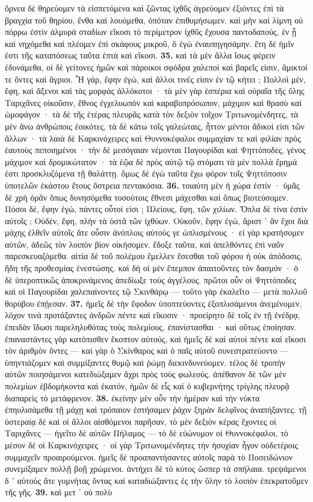 \documentclass[a4paper, 11pt, oneside, polutonikogreek, german]{article}
\begin{document}
ὄρνεα δὲ θηρεύομεν τὰ εἰσπετόμενα καὶ ζῶντας ἰχθῦς ἀγρεύομεν ἐξιόντες ἐπὶ τὰ βραγχία τοῦ θηρίου, ἔνθα καὶ λουόμεθα, ὁπόταν ἐπιθυμήσωμεν. καὶ μὴν καὶ λίμνη οὐ πόρρω ἐστὶν ἁλμυρὰ σταδίων εἴκοσι τὸ περίμετρον ἰχθῦς ἔχουσα παντοδαπούς, ἐν ᾗ καὶ νηχόμεθα καὶ πλέομεν ἐπὶ σκάφους μικροῦ, ὃ ἐγὼ ἐναυπηγησάμην. ἔτη δὲ ἡμῖν ἐστι τῆς καταπόσεως ταῦτα ἑπτὰ καὶ εἴκοσι. \textbf{35.} καὶ τὰ μὲν ἄλλα ἴσως φέρειν ἐδυνάμεθα, οἱ δὲ γείτονες ἡμῶν καὶ πάροικοι σφόδρα χαλεποὶ καὶ βαρεῖς εἰσιν, ἄμικτοί τε ὄντες καὶ ἄγριοι. Ἦ γάρ, ἔφην ἐγώ, καὶ ἄλλοι τινές εἰσιν ἐν τῷ κήτει ; Πολλοὶ μέν, ἔφη, καὶ ἄξενοι καὶ τὰς μορφὰς ἀλλόκοτοι · τὰ μὲν γὰρ ἑσπέρια καὶ οὐραῖα τῆς ὕλης Ταριχᾶνες οἰκοῦσιν, ἔθνος ἐγχελυωπὸν καὶ καραβοπρόσωπον, μάχιμον καὶ θρασὺ καὶ ὠμοφάγον · τὰ δὲ τῆς ἑτέρας πλευρᾶς κατὰ τὸν δεξιὸν τοῖχον Τριτωνομένδητες, τὰ μὲν ἄνω ἀνθρώποις ἐοικότες, τὰ δὲ κάτω τοῖς γαλεώταις, ἧττον μέντοι ἄδικοί εἰσι τῶν ἄλλων · τὰ λαιὰ δὲ Καρκινόχειρες καὶ Θυννοκέφαλοι συμμαχίαν τε καὶ φιλίαν πρὸς ἑαυτοὺς πεποιημένοι · τὴν δὲ μεσόγαιαν νέμονται Παγουρίδαι καὶ Ψηττόποδες, γένος μάχιμον καὶ δρομικώτατον · τὰ ἑῷα δὲ πρὸς αὐτῷ τῷ στόματι τὰ μὲν πολλὰ ἔρημά ἐστι προσκλυζόμενα τῇ θαλάττῃ. ὅμως δὲ ἐγὼ ταῦτα ἔχω φόρον τοῖς Ψηττόποσιν ὑποτελῶν ἑκάστου ἔτους ὄστρεια πεντακόσια. \textbf{36.} τοιαύτη μὲν ἡ χώρα ἐστίν · ὑμᾶς δὲ χρὴ ὁρᾶν ὅπως δυνησόμεθα τοσούτοις ἔθνεσι μάχεσθαι καὶ ὅπως βιοτεύσομεν. Πόσοι δέ, ἔφην ἐγώ, πάντες οὗτοί εἰσι ; Πλείους, ἔφη, τῶν χιλίων. Ὅπλα δὲ τίνα ἐστὶν αὐτοῖς ; Οὐδέν, ἔφη, πλὴν τὰ ὀστᾶ τῶν ἰχθύων. Οὐκοῦν, ἔφην ἐγώ, ἄριστ ᾽ ἂν ἔχοι διὰ μάχης ἐλθεῖν αὐτοῖς ἅτε οὖσιν ἀνόπλοις αὑτούς γε ὡπλισμένους · εἰ γὰρ κρατήσομεν αὐτῶν, ἀδεῶς τὸν λοιπὸν βίον οἰκήσομεν. ἔδοξε ταῦτα, καὶ ἀπελθόντες ἐπὶ ναῦν παρεσκευαζόμεθα. αἰτία δὲ τοῦ πολέμου ἔμελλεν ἔσεσθαι τοῦ φόρου ἡ οὐκ ἀπόδοσις, ἤδη τῆς προθεσμίας ἐνεστώσης. καὶ δὴ οἱ μὲν ἔπεμπον ἀπαιτοῦντες τὸν δασμόν · ὁ δὲ ὑπεροπτικῶς ἀποκρινάμενος ἀπεδίωξε τοὺς ἀγγέλους. πρῶτοι οὖν οἱ Ψηττόποδες καὶ οἱ Παγουρίδαι χαλεπαίνοντες τῷ Σκινθάρῳ --- τοῦτο γὰρ ἐκαλεῖτο --- μετὰ πολλοῦ θορύβου ἐπῄεσαν. \textbf{37.} ἡμεῖς δὲ τὴν ἔφοδον ὑποπτεύοντες ἐξοπλισάμενοι ἀνεμένομεν, λόχον τινὰ προτάξαντες ἀνδρῶν πέντε καὶ εἴκοσιν · προείρητο δὲ τοῖς ἐν τῇ ἐνέδρᾳ, ἐπειδὰν ἴδωσι παρεληλυθότας τοὺς πολεμίους, ἐπανίστασθαι · καὶ οὕτως ἐποίησαν. ἐπαναστάντες γὰρ κατόπισθεν ἔκοπτον αὐτούς, καὶ ἡμεῖς δὲ καὶ αὐτοὶ πέντε καὶ εἴκοσι τὸν ἀριθμὸν ὄντες --- καὶ γὰρ ὁ Σκίνθαρος καὶ ὁ παῖς αὐτοῦ συνεστρατεύοντο --- ὑπηντιάζομεν καὶ συμμίξαντες θυμῷ καὶ ῥώμῃ διεκινδυνεύομεν. τέλος δὲ τροπὴν αὐτῶν ποιησάμενοι κατεδιώξαμεν ἄχρι πρὸς τοὺς φωλεούς. ἀπέθανον δὲ τῶν μὲν πολεμίων ἑβδομήκοντα καὶ ἑκατόν, ἡμῶν δὲ εἷς καὶ ὁ κυβερνήτης τρίγλης πλευρᾷ διαπαρεὶς τὸ μετάφρενον. \textbf{38.} ἐκείνην μὲν οὖν τὴν ἡμέραν καὶ τὴν νύκτα ἐπηυλισάμεθα τῇ μάχῃ καὶ τρόπαιον ἐστήσαμεν ῥάχιν ξηρὰν δελφῖνος ἀναπήξαντες. τῇ ὑστεραίᾳ δὲ καὶ οἱ ἄλλοι αἰσθόμενοι παρῆσαν, τὸ μὲν δεξιὸν κέρας ἔχοντες οἱ Ταριχᾶνες --- ἡγεῖτο δὲ αὐτῶν Πήλαμος --- τὸ δὲ εὐώνυμον οἱ Θυννοκέφαλοι, τὸ μέσον δὲ οἱ Καρκινόχειρες · οἱ γὰρ Τριτωνομένδητες τὴν ἡσυχίαν ἦγον οὐδετέροις συμμαχεῖν προαιρούμενοι. ἡμεῖς δὲ προαπαντήσαντες αὐτοῖς παρὰ τὸ Ποσειδώνιον συνεμίξαμεν πολλῇ βοῇ χρώμενοι. ἀντήχει δὲ τὸ κύτος ὥσπερ τὰ σπήλαια. τρεψάμενοι δ ᾽ αὐτοὺς ἅτε γυμνήτας ὄντας καὶ καταδιώξαντες ἐς τὴν ὕλην τὸ λοιπὸν ἐπεκρατοῦμεν τῆς γῆς. \textbf{39.} καὶ μετ ᾽ οὐ πολὺ 
\end{document}
